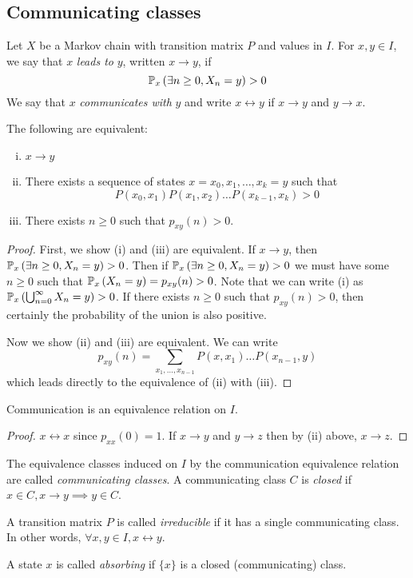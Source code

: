 \subsection{Communicating classes}
\begin{definition}
	Let \( X \) be a Markov chain with transition matrix \( P \) and values in \( I \).
	For \( x, y \in I \), we say that \( x \) \textit{leads to} \( y \), written \( x \to y \), if
	\[
		\mathbb{P}_{x}\left({\exists n \geq 0, X_n = y}\right) > 0
	\]
	We say that \( x \) \textit{communicates with} \( y \) and write \( x \leftrightarrow y \) if \( x \to y \) and \( y \to x \).
\end{definition}
\begin{theorem}
	The following are equivalent:
	\begin{enumerate}[(i)]
		\item \( x \to y \)
		\item There exists a sequence of states \( x = x_0, x_1, \dots, x_k = y \) such that
		      \[
			      P(x_0, x_1)P(x_1,x_2)\dots P(x_{k-1},x_k) > 0
		      \]
		\item There exists \( n \geq 0 \) such that \( p_{xy}(n) > 0 \).
	\end{enumerate}
\end{theorem}
\begin{proof}
	First, we show (i) and (iii) are equivalent.
	If \( x \to y \), then \( \mathbb{P}_{x}\left({\exists n \geq 0, X_n = y}\right) > 0 \).
	Then if \( \mathbb{P}_{x}\left({\exists n \geq 0, X_n = y}\right) > 0 \) we must have some \( n \geq 0 \) such that \( \mathbb{P}_{x}\left({X_n = y}\right) = p_{xy}(n) > 0 \).
	Note that we can write (i) as \( \mathbb{P}_{x}\left({\bigcup_{n=0}^\infty X_n = y}\right) > 0 \).
	If there exists \( n \geq 0 \) such that \( p_{xy}(n) > 0 \), then certainly the probability of the union is also positive.

	Now we show (ii) and (iii) are equivalent.
	We can write
	\[
		p_{xy}(n) = \sum_{x_1, \dots, x_{n-1}} P(x, x_1) \dots P(x_{n-1}, y)
	\]
	which leads directly to the equivalence of (ii) with (iii).
\end{proof}
\begin{corollary}
	Communication is an equivalence relation on \( I \).
\end{corollary}
\begin{proof}
	\( x \leftrightarrow x \) since \( p_{xx}(0) = 1 \).
	If \( x \to y \) and \( y \to z \) then by (ii) above, \( x \to z \).
\end{proof}
\begin{definition}
	The equivalence classes induced on \( I \) by the communication equivalence relation are called \textit{communicating classes}.
	A communicating class \( C \) is \textit{closed} if \( x \in C, x \to y \implies y \in C \).
\end{definition}
\begin{definition}
	A transition matrix \( P \) is called \textit{irreducible} if it has a single communicating class.
	In other words, \( \forall x, y \in I, x \leftrightarrow y \).
\end{definition}
\begin{definition}
	A state \( x \) is called \textit{absorbing} if \( \{ x \} \) is a closed (communicating) class.
\end{definition}

